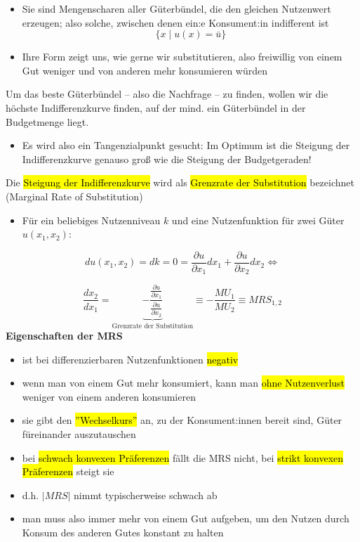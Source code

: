 \documentclass[a4paper, 10pt]{article}
\begin{document}
\begin{itemize}
    \item Sie sind Mengenscharen aller Güterbündel, die den gleichen Nutzenwert erzeugen; also solche, zwischen denen
ein:e Konsument:in indifferent ist
\begin{equation}
    \{ x \mid u(x) = \bar{u} \}
\end{equation}
    \item Ihre Form zeigt uns, wie gerne wir substitutieren, also freiwillig von einem Gut weniger und von anderen
mehr konsumieren würden
\end{itemize}
Um das beste Güterbündel – also die Nachfrage – zu finden, wollen wir die höchste Indifferenzkurve finden, auf der
mind. ein Güterbündel in der Budgetmenge liegt.
\begin{itemize}
    \item Es wird also ein Tangenzialpunkt gesucht: Im Optimum ist die Steigung der Indifferenzkurve genauso groß wie
die Steigung der Budgetgeraden!
\end{itemize}
Die \hl{Steigung der Indifferenzkurve} wird als \hl{Grenzrate der Substitution} bezeichnet (Marginal Rate of
Substitution)
\begin{itemize}
    \item Für ein beliebiges Nutzenniveau $k$ und eine Nutzenfunktion für zwei Güter $u(x_1, x_2)$: 
\end{itemize}
\begin{equation}
    du(x_1, x_2) = dk = 0 = \frac{\partial u}{\partial x_1} dx_1 + \frac{\partial u}{\partial x_2} dx_2 \Leftrightarrow
\end{equation}

\begin{equation}
    \frac{dx_2}{dx_1} =\underbrace{ - \frac{\frac{\partial u}{\partial x_1}}{\frac{\partial u}{\partial x_2}}}_{\text{Grenzrate der Substitution}} \equiv  - \frac{MU_1}{MU_2} \equiv MRS_{1,2}
\end{equation}
\textbf{Eigenschaften der MRS}
\begin{itemize}
    \item ist bei differenzierbaren Nutzenfunktionen \hl{negativ}
    \item wenn man von einem Gut mehr konsumiert, kann man \hl{ohne Nutzenverlust} weniger von einem anderen konsumieren
    \item sie gibt den \hl{''Wechselkurs''} an, zu der Konsument:innen bereit sind, Güter füreinander auszutauschen
    \item bei \hl{schwach konvexen Präferenzen} fällt die MRS nicht, bei \hl{strikt konvexen Präferenzen} steigt sie
    \item d.h. $|MRS|$ nimmt typischerweise schwach ab
    \item man muss also immer mehr von einem Gut aufgeben, um den Nutzen durch Konsum des anderen Gutes konstant zu halten
\end{itemize}
\end{document}
